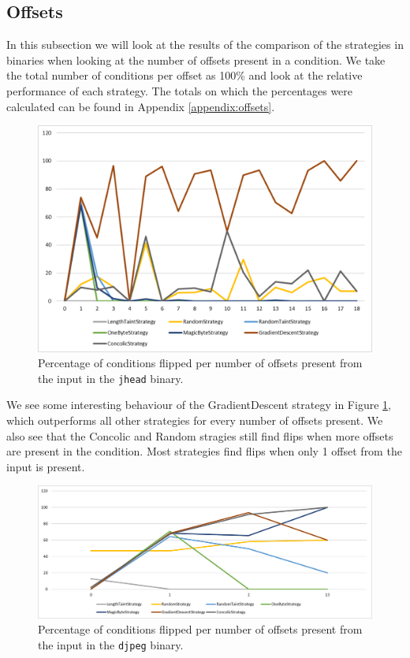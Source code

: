 \subsection{Offsets}
In this subsection we will look at the results of the comparison of the strategies in binaries when looking at the number of offsets present in a condition. We take the total number of conditions per offset as 100\% and look at the relative performance of each strategy. The totals on which the percentages were calculated can be found in Appendix \ref{appendix:offsets}.
\begin{figure}[H]
    \centering
    \includegraphics[width=.8\linewidth]{5_results/graphs/jhead-offsets.png}  
    \caption{Percentage of conditions flipped per number of offsets present from the input in the \texttt{jhead} binary.}
    \label{fig:jheadOffsets}
\end{figure}
We see some interesting behaviour of the GradientDescent strategy in Figure \ref{fig:jheadOffsets}, which outperforms all other strategies for every number of offsets present. We also see that the Concolic and Random stragies still find flips when more offsets are present in the condition. Most strategies find flips when only 1 offset from the input is present.
\begin{figure}[H]
    \centering
    \includegraphics[width=.8\linewidth]{5_results/graphs/djpeg-offsets.png}  
    \caption{Percentage of conditions flipped per number of offsets present from the input in the \texttt{djpeg} binary.}
    \label{fig:djpegOffsets}
\end{figure}
